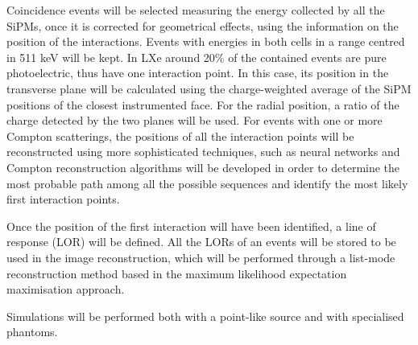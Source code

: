 Coincidence events will be selected measuring the energy collected by all the SiPMs, once it is corrected for geometrical effects, using the information on the position of the interactions. Events with energies in both cells in a range centred in  511 keV will be kept. In LXe around 20\% of the contained events are pure photoelectric, thus have one interaction point. In this case, its position in the transverse plane will be calculated using the charge-weighted average of the SiPM positions of the closest instrumented face. For the radial position, a ratio of the charge detected by the two planes will be used. For events with one or more Compton scatterings, the positions of all the interaction points will be reconstructed using more sophisticated techniques, such as neural networks and Compton reconstruction algorithms will be developed in order to determine the most probable path among all the possible sequences and identify the most likely first interaction points.

Once the position of the first interaction will have been identified, a line of response (LOR) will be defined. All the LORs of an events will be stored to be used in the image reconstruction, which will be performed through a list-mode reconstruction method based in the maximum likelihood expectation maximisation approach.

Simulations will be performed both with a point-like source and with specialised phantoms.
\\